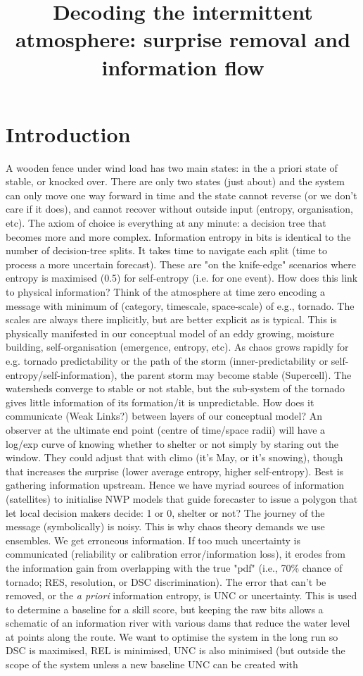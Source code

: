 \documentclass[draft]{ametsoc}
\title{Decoding the intermittent atmosphere: surprise removal and information flow}
\affiliation{Cooperative for Mesoscale Meteorological Studies, University of Oklahoma, OK, USA \\ NOAA/OAR/National Severe Storms Laboratory, OK, USA \\ Valparaiso University, Indiana, USA}
\begin{document}
\maketitle

\section{Introduction}
A wooden fence under wind load has two main states: in the a priori state of stable, or knocked over. There are only two states (just about) and the system can only move one way forward in time and the state cannot reverse (or we don't care if it does), and cannot recover without outside input (entropy, organisation, etc). The axiom of choice is everything at any minute: a decision tree that becomes more and more complex. Information entropy in bits is identical to the number of decision-tree splits. It takes time to navigate each split (time to process a more uncertain forecast). These are "on the knife-edge" scenarios where entropy is maximised (0.5) for self-entropy (i.e. for one event). How does this link to physical information? Think of the atmosphere at time zero encoding a message with minimum of (category, timescale, space-scale) of e.g., tornado. The scales are always there implicitly, but are better explicit as is typical. This is physically manifested in our conceptual model of an eddy growing, moisture building, self-organisation (emergence, entropy, etc). As chaos grows rapidly for e.g. tornado predictability or the path of the storm (inner-predictability or self-entropy/self-information), the parent storm may become stable (Supercell). The watersheds converge to stable or not stable, but the sub-system of the tornado gives little information of its formation/it is unpredictable. How does it communicate (Weak Links?) between layers of our conceptual model? An observer at the ultimate end point (centre of time/space radii) will have a log/exp curve of knowing whether to shelter or not simply by staring out the window. They could adjust that with climo (it's May, or it's snowing), though that increases the surprise (lower average entropy, higher self-entropy). Best is gathering information upstream. Hence we have myriad sources of information (satellites) to initialise NWP models that guide forecaster to issue a polygon that let local decision makers decide: 1 or 0, shelter or not? The journey of the message (symbolically) is noisy. This is why chaos theory demands we use ensembles. We get erroneous information. If too much uncertainty is communicated (reliability or calibration error/information loss), it erodes from the information gain from overlapping with the true "pdf" (i.e., 70\% chance of tornado; RES, resolution, or DSC discrimination). The error that can't be removed, or the \emph{a priori} information entropy, is UNC or uncertainty. This is used to determine a baseline for a skill score, but keeping the raw bits allows a schematic of an information river with various dams that reduce the water level at points along the route. We want to optimise the system in the long run so DSC is maximised, REL is minimised, UNC is also minimised (but outside the scope of the system unless a new baseline UNC can be created with 
\end{document}
